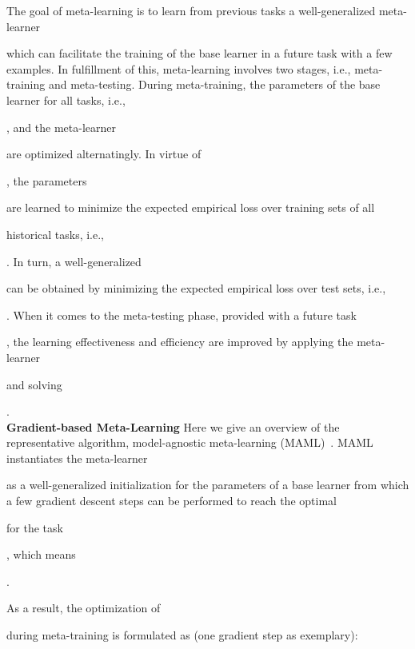 \documentclass{article}
\begin{document}
The goal of meta-learning is to learn from previous tasks a well-generalized meta-learner \begin{small}\end{small} which can facilitate the training of the base learner in a future task with a few examples. 
In fulfillment of this, meta-learning involves two stages, i.e., meta-training and meta-testing.
During meta-training, the parameters of the base learner for all tasks, i.e., \begin{small}\end{small}, and the meta-learner \begin{small}\end{small} are optimized alternatingly.  
In virtue of \begin{small}\end{small},  the parameters \begin{small}\end{small} are learned to minimize the expected empirical loss over training sets of all \begin{small}\end{small} historical tasks, i.e., \begin{small}\end{small}.  
In turn, a well-generalized \begin{small}\end{small} can be obtained by minimizing the expected empirical loss over test sets, i.e., \begin{small}\end{small}.  
When it comes to the meta-testing phase, provided with 
a future task \begin{small}\end{small},  the learning effectiveness and efficiency are improved by applying the meta-learner 
\begin{small}\end{small} and solving  \begin{small}\end{small}.\\
\textbf{Gradient-based Meta-Learning} Here we give an overview of the representative algorithm,  model-agnostic meta-learning (MAML)~\cite{finn2017model}.
MAML instantiates the meta-learner \begin{small}\end{small}
as a well-generalized initialization for the parameters of a base learner from which a few gradient descent steps can be performed to reach the optimal \begin{small}\end{small} for the task \begin{small}\end{small}, which means
\begin{small}
.
\end{small}
As a result, 
the optimization of \begin{small}
\end{small} during meta-training is formulated as (one gradient step as exemplary):
\end{document}
